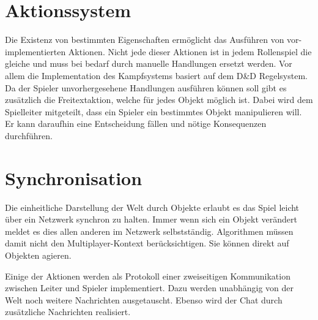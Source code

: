 \section{Aktionssystem}
\label{sec:Aktionssystem}
Die Existenz von bestimmten Eigenschaften ermöglicht das Ausführen von vor-implementierten Aktionen. Nicht jede dieser Aktionen ist in jedem Rollenspiel die gleiche und muss bei bedarf durch manuelle Handlungen ersetzt werden. Vor allem die Implementation des Kampfsystems basiert auf dem D\&D Regelsystem.\newline
Da der Spieler unvorhergesehene Handlungen ausführen können soll gibt es zusätzlich die Freitextaktion, welche für jedes Objekt möglich ist. Dabei wird dem Spielleiter mitgeteilt, dass ein Spieler ein bestimmtes Objekt manipulieren will. Er kann daraufhin eine Entscheidung fällen und nötige Konsequenzen durchführen.

\section{Synchronisation}
Die einheitliche Darstellung der Welt durch Objekte erlaubt es das Spiel leicht über ein Netzwerk synchron zu halten. Immer wenn sich ein Objekt verändert meldet es dies allen anderen im Netzwerk selbstständig. Algorithmen müssen damit nicht den Multiplayer-Kontext berücksichtigen. Sie können direkt auf Objekten agieren.

Einige der Aktionen werden als Protokoll einer zweiseitigen Kommunikation zwischen Leiter und Spieler implementiert. Dazu werden unabhängig von der Welt noch weitere Nachrichten ausgetauscht. Ebenso wird der Chat durch zusätzliche Nachrichten realisiert.
